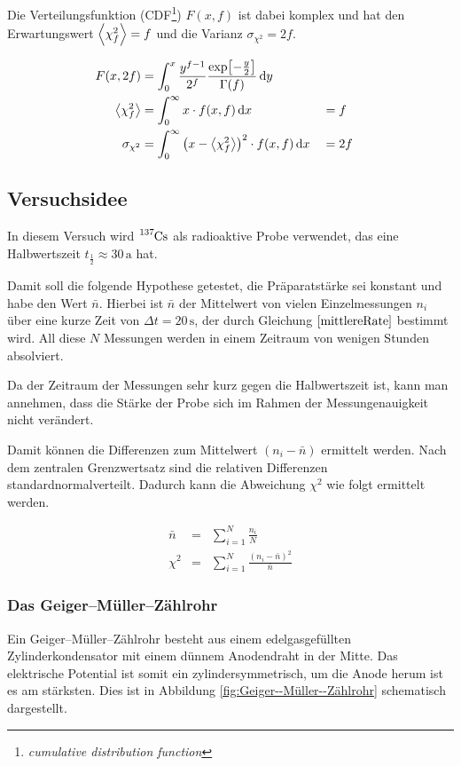 \documentclass[12pt,a4paper]{scrartcl}
\numberwithin{equation}{section} %
\renewcommand{\[}{} %
\renewcommand{\]}{\noindent} %
\begin{document}
Die Verteilungsfunktion (CDF\footnote{\emph{cumulative distribution function}}) \(F(x, f)\) ist dabei komplex und hat den Erwartungswert \(\expval{\chi_f^2}=f\) und die Varianz \(\sigma_{\chi^2}=2f\).

\begin{align}
    F(x, 2f) &=
        \int_0^x
            \frac{y^{f-1}}{2^f}
                \frac{\exp[-\frac{y}{2}]}{\Gamma(f)}
            \,\mathrm dy \\
    \expval{\chi_f^2} &=
        \int_0^\infty x\cdot f(x, f)
            \,\mathrm dx
        &&= f \\
    \sigma_{\chi^2} &=
        \int_0^\infty \left(x - \expval{\chi_f^2}\right)^2 \cdot f(x, f)
            \,\mathrm dx
         &&=2f
\end{align}

\hypertarget{versuchsidee}{%
\subsection{Versuchsidee}\label{versuchsidee}}

In diesem Versuch wird \(\ce{^{137}Cs}\) als radioaktive Probe verwendet, das eine Halbwertszeit \(t_\frac{1}{2}\approx 30\,\mathrm a\) hat.

Damit soll die folgende Hypothese getestet, die Präparatstärke sei konstant und habe den Wert \(\bar n\). Hierbei ist \(\bar n\) der Mittelwert von vielen Einzelmessungen \(n_i\) über eine kurze Zeit von \(\Delta t=20\,\mathrm s\), der durch Gleichung \(\eqref{mittlereRate}\) bestimmt wird. All diese \(N\) Messungen werden in einem Zeitraum von wenigen Stunden absolviert.

Da der Zeitraum der Messungen sehr kurz gegen die Halbwertszeit ist, kann man annehmen, dass die Stärke der Probe sich im Rahmen der Messungenauigkeit nicht verändert.

Damit können die Differenzen zum Mittelwert \((n_i-\bar n)\) ermittelt werden. Nach dem zentralen Grenzwertsatz sind die relativen Differenzen standardnormalverteilt. Dadurch kann die Abweichung \(\chi^2\) wie folgt ermittelt werden.

\begin{eqnarray}
    \bar n &=& \sum_{i=1}^N \frac{n_i}{N} \label{mittlereRate} \\
    \chi^2 &=& \sum_{i=1}^N \frac{(n_i-\bar n)^2}{\bar n} \label{ChiSquared}
\end{eqnarray}

\subsubsection{Das Geiger--Müller--Zählrohr}
\label{Geiger--Müller--Zählrohr}
Ein Geiger--Müller--Zählrohr besteht aus einem edelgasgefüllten Zylinderkondensator mit einem dünnem Anodendraht in der Mitte. Das elektrische Potential ist somit ein zylindersymmetrisch, um die Anode herum ist es am stärksten. Dies ist in Abbildung \ref{fig:Geiger--Müller--Zählrohr} schematisch dargestellt.
\end{document}
